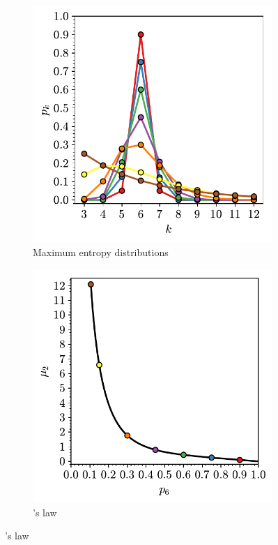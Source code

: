 \begin{figure}[bt]
     \centering
     
     \begin{subfigure}[b]{0.45\textwidth}
         \centering
         \includegraphics[width=\textwidth]{./figures/methods/lm_1.pdf}
         \caption{Maximum entropy distributions}
         \label{fig:lm1}
     \end{subfigure}
     \hfill
      \begin{subfigure}[b]{0.45\textwidth}
         \centering
         \includegraphics[width=\textwidth]{./figures/methods/lm_2.pdf}
         \caption{\lm's law}
         \label{fig:lm2}
     \end{subfigure}
     \hfill
     

\end{figure}
